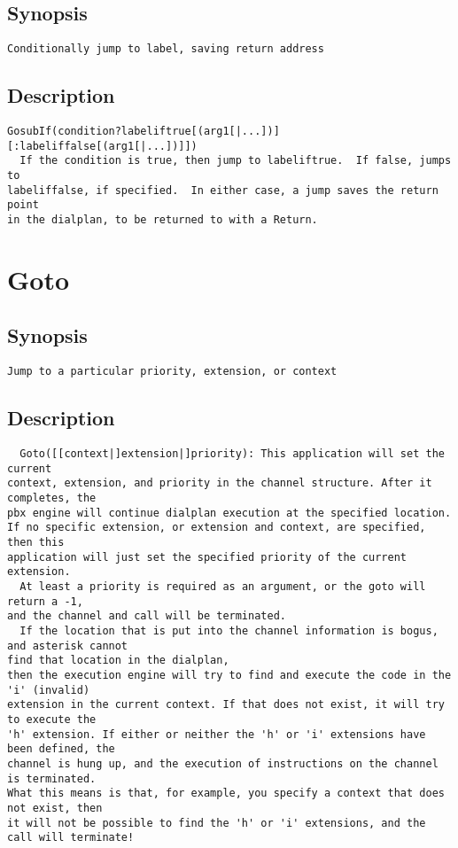 \subsection{Synopsis}
\begin{verbatim}
Conditionally jump to label, saving return address
\end{verbatim}
\subsection{Description}
\begin{verbatim}
GosubIf(condition?labeliftrue[(arg1[|...])][:labeliffalse[(arg1[|...])]])
  If the condition is true, then jump to labeliftrue.  If false, jumps to
labeliffalse, if specified.  In either case, a jump saves the return point
in the dialplan, to be returned to with a Return.

\end{verbatim}


\section{Goto}
\subsection{Synopsis}
\begin{verbatim}
Jump to a particular priority, extension, or context
\end{verbatim}
\subsection{Description}
\begin{verbatim}
  Goto([[context|]extension|]priority): This application will set the current
context, extension, and priority in the channel structure. After it completes, the
pbx engine will continue dialplan execution at the specified location.
If no specific extension, or extension and context, are specified, then this
application will just set the specified priority of the current extension.
  At least a priority is required as an argument, or the goto will return a -1,
and the channel and call will be terminated.
  If the location that is put into the channel information is bogus, and asterisk cannot
find that location in the dialplan,
then the execution engine will try to find and execute the code in the 'i' (invalid)
extension in the current context. If that does not exist, it will try to execute the
'h' extension. If either or neither the 'h' or 'i' extensions have been defined, the
channel is hung up, and the execution of instructions on the channel is terminated.
What this means is that, for example, you specify a context that does not exist, then
it will not be possible to find the 'h' or 'i' extensions, and the call will terminate!

\end{verbatim}


